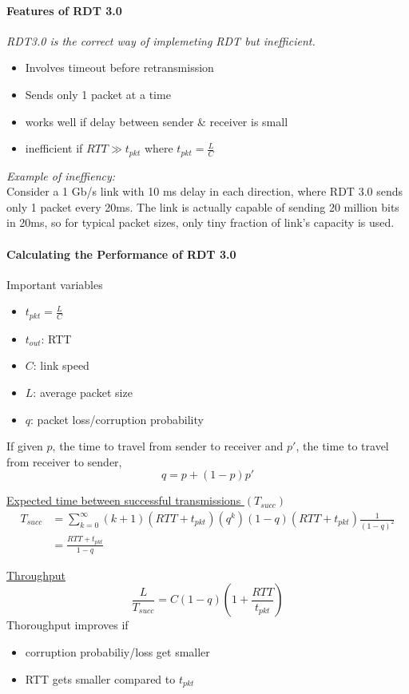 \documentclass[a4paper]{article}
\begin{document}
\paragraph{Features of RDT 3.0}\mbox{}

\medskip
\noindent \textit{RDT3.0 is the correct way of implemeting RDT but inefficient.}
\begin{itemize}
    \item Involves timeout before retransmission
    \item Sends only 1 packet at a time
    \item works well if delay between sender \& receiver is small
    \item inefficient if $RTT \gg t_{pkt}$ where $t_{pkt}=\displaystyle\frac{L}{C}$
\end{itemize}
\noindent\textit{Example of ineffiency:}\\
Consider a 1 Gb/s link with 10 ms delay in each direction, where RDT 3.0 sends only 1 packet every 20ms. The link is actually capable of sending 20 million bits in 20ms, so for typical packet sizes, only tiny fraction of link's capacity is used.

\paragraph{Calculating the Performance of RDT 3.0}
Important variables
\begin{itemize}
    \item $t_{pkt}=\displaystyle\frac{L}{C}$
    \item $t_{out}$: RTT
    \item ${C}$: link speed
    \item ${L}$: average packet size
    \item ${q}$: packet loss/corruption probability
\end{itemize}
\noindent If given $p$, the time to travel from sender to receiver and $p'$, the time to travel from receiver to sender,
$$ q = p+(1-p)p' $$

\noindent\underline{Expected time between successful transmissions $(T_{succ})$}
\begin{align*}
    T_{succ} &= \sum^\infty_{k=0}(k+1)(RTT+t_{pkt})(q^k)(1-q)(RTT+t_{pkt})\frac{1}{(1-q)^2}\\
    &= \frac{RTT+t_{pkt}}{1-q}
\end{align*}

\noindent\underline{Throughput}
$$\frac{L}{T_{succ}} = C(1-q)\left(1+\frac{RTT}{t_{pkt}}\right)$$
Thoroughput improves if
\begin{itemize}
    \item corruption probabiliy/loss get smaller
    \item RTT gets smaller compared to $t_{pkt}$
\end{itemize}
\end{document}
